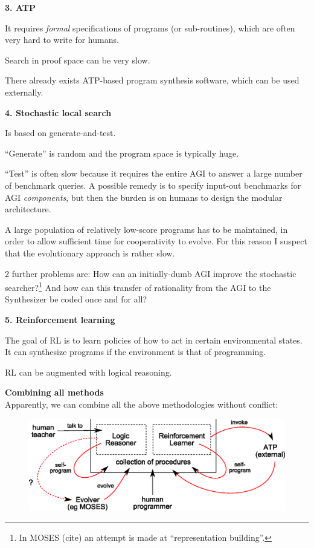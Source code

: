 \documentclass[a4paper]{report}
\begin{document}
\textbf{3. ATP}
\begin{compactenum}[(a)]
\item  It requires \textit{formal} specifications of programs (or sub-routines), which are often very hard to write for humans.
\item  Search in proof space can be very slow.
\item  There already exists ATP-based program synthesis software, which can be used externally.\\
\end{compactenum}

\textbf{4. Stochastic local search}
\begin{compactenum}[(a)]
\item  Is based on generate-and-test.
\item  ``Generate'' is random and the program space is typically huge.
\item  ``Test'' is often slow because it requires the entire AGI to answer a large number of benchmark queries.  A possible remedy is to specify input-out benchmarks for AGI \textit{components}, but then the burden is on humans to design the modular architecture.
\item  A large population of relatively low-score programs has to be maintained, in order to allow sufficient time for cooperativity to evolve.  For this reason I suspect that the evolutionary approach is rather slow.
\item  2 further problems are:  How can an initially-dumb AGI improve the stochastic searcher?\footnote{In MOSES (cite) an attempt is made at ``representation building''.} And how can this transfer of rationality from the AGI to the Synthesizer be coded once and for all?\\
\end{compactenum}

\textbf{5. Reinforcement learning} 
\begin{compactenum}[(a)]
\item  The goal of RL is to learn policies of how to act in certain environmental states.  It can synthesize programs if the environment is that of programming.
\item  RL can be augmented with logical reasoning.\\
\end{compactenum}

\textbf{Combining all methods}\\
Apparently, we can combine all the above methodologies without conflict:
\begin{figure}[H]
\centering
\includegraphics{combined-architecture.eps}
\vspace{-0.5cm}
\end{figure}
\end{document}
